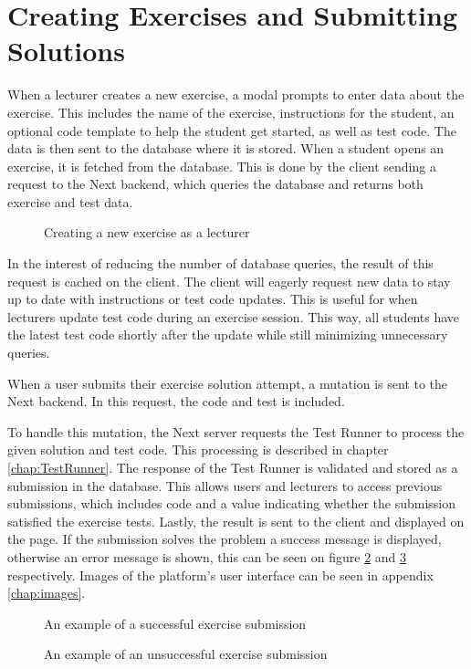 \section{Creating Exercises and Submitting Solutions}
When a lecturer creates a new exercise, a modal prompts to enter data about the exercise.
This includes the name of the exercise, instructions for the student, an optional code template to help the student get started, as well as test code.
The data is then sent to the database where it is stored.
When a student opens an exercise, it is fetched from the database.
This is done by the client sending a request to the Next backend, which queries the database and returns both exercise and test data.

\begin{figure}[H]
    \centering
    \caption{Creating a new exercise as a lecturer}
    \label{fig:create_exercise}
\end{figure}

In the interest of reducing the number of database queries, the result of this request is cached on the client.
The client will eagerly request new data to stay up to date with instructions or test code updates.
This is useful for when lecturers update test code during an exercise session.
This way, all students have the latest test code shortly after the update while still minimizing unnecessary queries.

When a user submits their exercise solution attempt, a mutation is sent to the Next backend.
In this request, the code and test is included.

To handle this mutation, the Next server requests the Test Runner to process the given solution and test code.
This processing is described in chapter \ref{chap:TestRunner}.
The response of the Test Runner is validated and stored as a submission in the database.
This allows users and lecturers to access previous submissions, which includes code and a value indicating whether the submission satisfied the exercise tests.
Lastly, the result is sent to the client and displayed on the page.
If the submission solves the problem a success message is displayed, otherwise an error message is shown, this can be seen on figure \ref{fig:exercise_success} and \ref{fig:exercise_fail} respectively.
Images of the platform's user interface can be seen in appendix \ref{chap:images}.

\begin{figure}[H]
	\centering
	\caption{An example of a successful exercise submission}
	\label{fig:exercise_success}
\end{figure}

\begin{figure}[H]
	\centering
	\caption{An example of an unsuccessful exercise submission}
	\label{fig:exercise_fail}
\end{figure}
